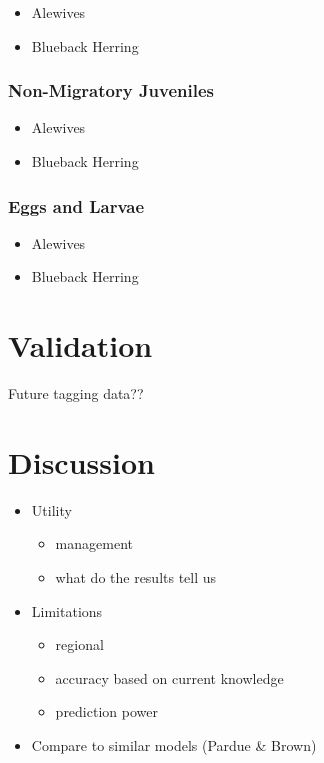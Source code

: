 \documentclass[
]{book}
\providecommand{\tightlist}{%
  \setlength{\itemsep}{0pt}\setlength{\parskip}{0pt}}
\begin{document}
\begin{itemize}
\tightlist
\item
  Alewives
\item
  Blueback Herring
\end{itemize}

\hypertarget{non-migratory-juveniles-4}{%
\subsection{Non-Migratory Juveniles}\label{non-migratory-juveniles-4}}

\begin{itemize}
\tightlist
\item
  Alewives
\item
  Blueback Herring
\end{itemize}

\hypertarget{eggs-and-larvae-1}{%
\subsection{Eggs and Larvae}\label{eggs-and-larvae-1}}

\begin{itemize}
\tightlist
\item
  Alewives
\item
  Blueback Herring
\end{itemize}

\hypertarget{validation}{%
\chapter{Validation}\label{validation}}

Future tagging data??

\hypertarget{discussion}{%
\chapter{Discussion}\label{discussion}}

\begin{itemize}
\tightlist
\item
  Utility

  \begin{itemize}
  \tightlist
  \item
    management
  \item
    what do the results tell us
  \end{itemize}
\item
  Limitations

  \begin{itemize}
  \tightlist
  \item
    regional
  \item
    accuracy based on current knowledge
  \item
    prediction power
  \end{itemize}
\item
  Compare to similar models (Pardue \& Brown)
\end{itemize}
\end{document}
